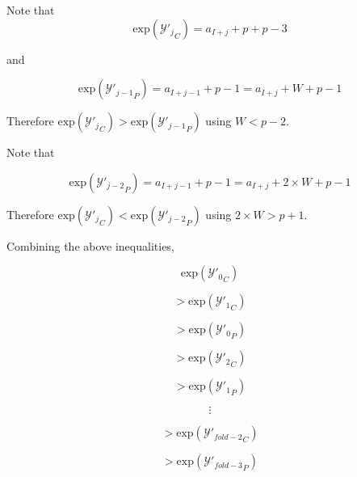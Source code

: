 \documentclass[12pt]{article}
\providecommand{\exp}{\ensuremath{\text{exp}}}
\theoremstyle{definition}
\numberwithin{equation}{section}
\begin{document}
    Note that
    \begin{equation*}
      \exp({\mathcal{Y}'_j}_C) = a_{I + j} + p + p - 3
    \end{equation*}

    and

    \begin{equation*}
      \exp({\mathcal{Y}'_{j - 1}}_P) = a_{I + j - 1} + p - 1 = a_{I + j} + W + p - 1
    \end{equation*}

    Therefore $\exp({\mathcal{Y}'_j}_C) > \exp({\mathcal{Y}'_{j - 1}}_P)$ using $W < p - 2$.

    Note that

    \begin{equation*}
      \exp({\mathcal{Y}'_{j - 2}}_P) = a_{I + j - 1} + p - 1 = a_{I + j} + 2\times W + p - 1
    \end{equation*}

    Therefore $\exp({\mathcal{Y}'_j}_C) < \exp({\mathcal{Y}'_{j - 2}}_P)$ using $2 \times W > p + 1$.

    Combining the above inequalities,

    \begin{equation*}
    \exp({\mathcal{Y}'_0}_C)
    \end{equation*}

    \begin{equation*}
    > \exp({\mathcal{Y}'_1}_C)
    \end{equation*}

    \begin{equation*}
    > \exp({\mathcal{Y}'_0}_P)
    \end{equation*}

    \begin{equation*}
    > \exp({\mathcal{Y}'_2}_C)
    \end{equation*}

    \begin{equation*}
    > \exp({\mathcal{Y}'_1}_P)
    \end{equation*}

    \begin{equation*}
    \vdots
    \end{equation*}

    \begin{equation*}
    > \exp({\mathcal{Y}'_{fold - 2}}_C)
    \end{equation*}

    \begin{equation*}
    > \exp({\mathcal{Y}'_{fold - 3}}_P)
    \end{equation*}
\end{document}
